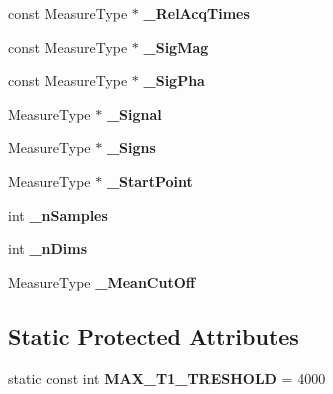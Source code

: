 \begin{DoxyCompactItemize}
\item 
\hypertarget{class_ox_1_1_calculator_t1_ad4831b39c7c92ec666ed9c493edf86db}{const Measure\-Type $\ast$ {\bfseries \-\_\-\-Rel\-Acq\-Times}}\label{class_ox_1_1_calculator_t1_ad4831b39c7c92ec666ed9c493edf86db}

\item 
\hypertarget{class_ox_1_1_calculator_t1_ac900082bed7219ecabb490b2c9049c4b}{const Measure\-Type $\ast$ {\bfseries \-\_\-\-Sig\-Mag}}\label{class_ox_1_1_calculator_t1_ac900082bed7219ecabb490b2c9049c4b}

\item 
\hypertarget{class_ox_1_1_calculator_t1_accb0c7f216c13789a8406d8f588f3280}{const Measure\-Type $\ast$ {\bfseries \-\_\-\-Sig\-Pha}}\label{class_ox_1_1_calculator_t1_accb0c7f216c13789a8406d8f588f3280}

\item 
\hypertarget{class_ox_1_1_calculator_t1_ae3a82567e3036dfa970c35e542ea0efc}{Measure\-Type $\ast$ {\bfseries \-\_\-\-Signal}}\label{class_ox_1_1_calculator_t1_ae3a82567e3036dfa970c35e542ea0efc}

\item 
\hypertarget{class_ox_1_1_calculator_t1_ae770bf1df65f217e264bc680e4376d09}{Measure\-Type $\ast$ {\bfseries \-\_\-\-Signs}}\label{class_ox_1_1_calculator_t1_ae770bf1df65f217e264bc680e4376d09}

\item 
\hypertarget{class_ox_1_1_calculator_t1_add1647551932c3bce7dc8a58fa445251}{Measure\-Type $\ast$ {\bfseries \-\_\-\-Start\-Point}}\label{class_ox_1_1_calculator_t1_add1647551932c3bce7dc8a58fa445251}

\item 
\hypertarget{class_ox_1_1_calculator_t1_a77afa72c6add367c72871e4662bf1325}{int {\bfseries \-\_\-n\-Samples}}\label{class_ox_1_1_calculator_t1_a77afa72c6add367c72871e4662bf1325}

\item 
\hypertarget{class_ox_1_1_calculator_t1_a8ca448ebef97ec9e98b7fd955dfcc132}{int {\bfseries \-\_\-n\-Dims}}\label{class_ox_1_1_calculator_t1_a8ca448ebef97ec9e98b7fd955dfcc132}

\item 
\hypertarget{class_ox_1_1_calculator_t1_a091c2674b79e1c0374637eff90e2becb}{Measure\-Type {\bfseries \-\_\-\-Mean\-Cut\-Off}}\label{class_ox_1_1_calculator_t1_a091c2674b79e1c0374637eff90e2becb}

\end{DoxyCompactItemize}
\subsection*{Static Protected Attributes}
\begin{DoxyCompactItemize}
\item 
\hypertarget{class_ox_1_1_calculator_t1_ab72a428970df42c8a0c1cc4120a45338}{static const int {\bfseries M\-A\-X\-\_\-\-T1\-\_\-\-T\-R\-E\-S\-H\-O\-L\-D} = 4000}\label{class_ox_1_1_calculator_t1_ab72a428970df42c8a0c1cc4120a45338}

\end{DoxyCompactItemize}


